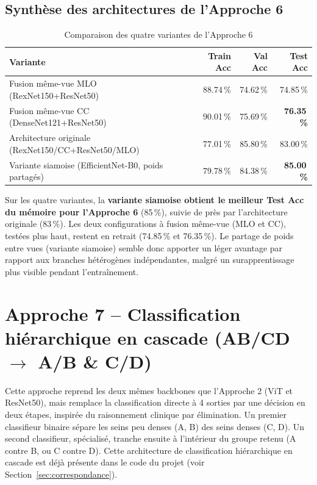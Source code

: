 \documentclass[12pt,a4paper]{report}
\begin{document}
\subsection{Synthèse des architectures de l'Approche 6}
\begin{table}[h]
\centering
\caption{Comparaison des quatre variantes de l'Approche 6}
\begin{tabular}{lrrr}
\toprule
Variante & Train Acc & Val Acc & Test Acc \\
\midrule
Fusion même-vue MLO (RexNet150+ResNet50) & 88.74\,\% & 74.62\,\% & 74.85\,\% \\
Fusion même-vue CC (DenseNet121+ResNet50) & 90.01\,\% & 75.69\,\% & \textbf{76.35\,\%} \\
Architecture originale (RexNet150/CC+ResNet50/MLO) & 77.01\,\% & 85.80\,\% & 83.00\,\% \\
Variante siamoise (EfficientNet-B0, poids partagés) & 79.78\,\% & 84.38\,\% & \textbf{85.00\,\%} \\
\bottomrule
\end{tabular}
\end{table}

Sur les quatre variantes, la \textbf{variante siamoise obtient le meilleur
Test Acc du mémoire pour l'Approche 6} (85\,\%), suivie de près par
l'architecture originale (83\,\%). Les deux configurations à fusion même-vue
(MLO et CC), testées plus haut, restent en retrait (74.85\,\% et 76.35\,\%).
Le partage de poids entre vues (variante siamoise) semble donc apporter un
léger avantage par rapport aux branches hétérogènes indépendantes, malgré un
surapprentissage plus visible pendant l'entraînement.

\section{Approche 7 -- Classification hiérarchique en cascade (AB/CD $\to$ A/B \& C/D)}
\label{sec:approche7}

Cette approche reprend les deux mêmes backbones que l'Approche 2 (ViT et
ResNet50), mais remplace la classification directe à 4 sorties par une
décision en deux étapes, inspirée du raisonnement clinique par élimination.
Un premier classifieur binaire sépare les seins peu denses (A, B) des
seins denses (C, D). Un second classifieur, spécialisé, tranche ensuite à
l'intérieur du groupe retenu (A contre B, ou C contre D). Cette architecture
de classification hiérarchique en cascade est déjà présente dans le code du
projet (voir Section~\ref{sec:correspondance}).
\end{document}
